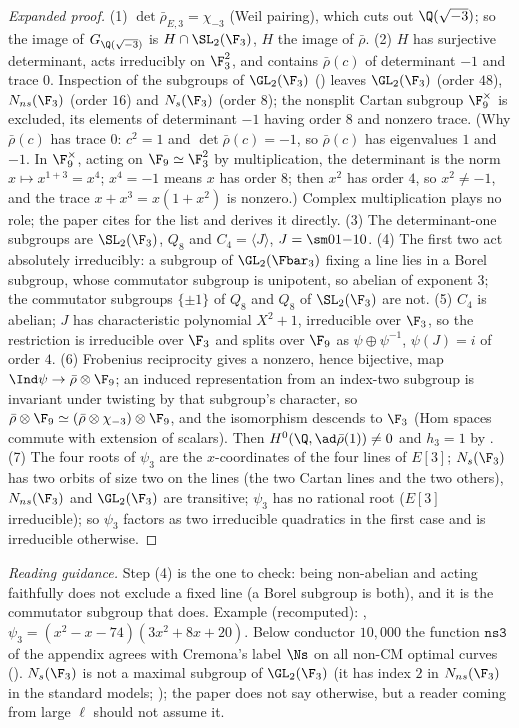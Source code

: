 \begin{sloppypar}
\begin{proof}[Expanded proof]
(1) $\det\bar\rho_{E,3}=\chi_{-3}$ (Weil pairing), which cuts out $\Q(\sqrt{-3})$; so the image of $G_{\Q(\sqrt{-3})}$ is $H\cap\SL_2(\F_3)$, $H$ the image of $\bar\rho$. (2) $H$ has surjective
determinant, acts irreducibly on $\F_3^2$, and contains $\bar\rho(c)$ of determinant $-1$ and trace $0$. Inspection of the subgroups of $\GL_2(\F_3)$ () leaves $\GL_2(\F_3)$
(order $48$), $N_{ns}(\F_3)$ (order $16$) and $N_s(\F_3)$ (order $8$); the nonsplit Cartan subgroup $\F_9^\times$ is excluded, its elements of determinant $-1$ having order $8$ and nonzero
trace. (Why $\bar\rho(c)$ has trace $0$: $c^2=1$ and $\det\bar\rho(c)=-1$, so $\bar\rho(c)$ has eigenvalues $1$ and $-1$. In $\F_9^\times$, acting on $\F_9\simeq\F_3^2$ by multiplication, the determinant
is the norm $x\mapsto x^{1+3}=x^4$; $x^4=-1$ means $x$ has order $8$; then $x^2$ has order $4$, so $x^2\ne-1$, and the trace $x+x^3=x(1+x^2)$ is nonzero.) Complex multiplication plays no role; the paper cites \cite{Zywina15} for the list and derives it directly.
(3) The determinant-one subgroups are $\SL_2(\F_3)$, $Q_8$ and $C_4=\langle J\rangle$, $J=\sm01{-1}0$. (4) The first two act absolutely irreducibly: a subgroup of $\GL_2(\Fbar_3)$ fixing a line lies
in a Borel subgroup, whose commutator subgroup is unipotent, so abelian of exponent $3$; the commutator subgroups $\{\pm1\}$ of $Q_8$ and $Q_8$ of $\SL_2(\F_3)$ are not. (5) $C_4$ is abelian; $J$ has characteristic polynomial $X^2+1$, irreducible over $\F_3$, so the
restriction is irreducible over $\F_3$ and splits over $\F_9$ as $\psi\oplus\psi^{-1}$, $\psi(J)=i$ of order $4$. (6) Frobenius reciprocity gives a nonzero, hence bijective, map
$\Ind\psi\to\bar\rho\otimes\F_9$; an induced representation from an index-two subgroup is invariant under twisting by that subgroup's character, so $\bar\rho\otimes\F_9\simeq(\bar\rho\otimes\chi_{-3})\otimes\F_9$,
and the isomorphism descends to $\F_3$ (Hom spaces commute with extension of scalars). Then $H^0(\Q,\ad\bar\rho(1))\ne0$ and $h_3=1$ by . (7) The four roots of $\psi_3$ are the
$x$-coordinates of the four lines of $E[3]$; $N_s(\F_3)$ has two orbits of size two on the lines (the two Cartan lines and the two others), $N_{ns}(\F_3)$ and $\GL_2(\F_3)$ are transitive;
$\psi_3$ has no rational root ($E[3]$ irreducible); so $\psi_3$ factors as two irreducible quadratics in the first case and is irreducible otherwise.
\end{proof}

\noindent\emph{Reading guidance.} Step (4) is the one to check: being non-abelian and acting faithfully does not exclude a fixed line (a Borel subgroup is both), and it is
the commutator subgroup that does. Example (recomputed): ,
$\psi_3=(x^2-x-74)(3x^2+8x+20)$. Below conductor $10{,}000$ the function $\texttt{ns3}$ of the appendix agrees with Cremona's label $\Ns$ on all non-CM optimal curves ().
$N_s(\F_3)$ is not a maximal subgroup of $\GL_2(\F_3)$ (it has index $2$ in $N_{ns}(\F_3)$ in the standard models; ); the paper does not say otherwise, but a reader coming
from large $\ell$ should not assume it.


\end{sloppypar}
